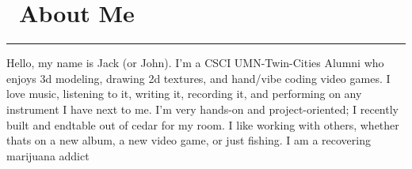 \documentclass[letterpaper, 11pt]{article}
\begin{document}
    \section*{{\color{black}\faBug} \ \bfseries{About Me}}
        {\color{ForestGreen} \rule{\linewidth}{0.5mm}}
        \begin{flushleft}
            Hello, my name is Jack (or John). I'm a CSCI UMN-Twin-Cities Alumni who enjoys 3d modeling, drawing 2d textures, and hand/vibe coding video games. 
            I love music, listening to it, writing it, recording it, and performing on any instrument I have next to me. 
            I'm very hands-on and project-oriented; I recently built and endtable out of cedar for my room. I like working with others, whether thats on a new album, a new video game, or just fishing. I am a recovering marijuana addict
        \end{flushleft}
\end{document}
